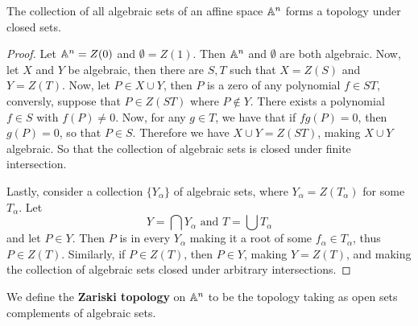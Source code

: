 \begin{lemma}\label{1.1.1}
    The collection of all algebraic sets of an affine space $\mathbb{A}^n$ forms a
    topology under closed sets.
\end{lemma}
\begin{proof}
    Let $\mathbb{A}^n=Z(0)$ and $\emptyset=Z(1)$. Then $\mathbb{A}^n$ and $\emptyset$ are both
    algebraic. Now, let  $X$ and  $Y$ be algebraic, then there are  $S,T$ such
    that  $X=Z(S)$ and $Y=Z(T)$. Now, let $P \in X \cup Y$, then  $P$ is a zero
    of any polynomial $f \in ST$, conversly, suppose that $P \in Z(ST)$ where $P
    \notin Y$. There exists a polynomial  $f \in S$ with  $f(P) \neq 0$. Now,
    for any $g \in T$, we have that if $fg(P)=0$, then $g(P)=0$, so that $P \in
    S$. Therefore we have  $X \cup Y=Z(ST)$, making $X \cup Y$ algebraic. So
    that the collection of algebraic sets is closed under finite intersection.

    Lastly, consider a collection $\{Y_\alpha\}$ of algebraic sets, where
    $Y_\alpha=Z(T_\alpha)$ for some $T_\alpha$. Let
    \begin{equation*}
        Y=\bigcap{Y_\alpha} \text{ and } T=\bigcup{T_\alpha}
    \end{equation*}
    and let $P \in Y$. Then $P$ is in every $Y_\alpha$ making it a root of some
    $f_\alpha \in T_\alpha$, thus  $P \in Z(T)$. Similarly, if $P \in Z(T)$,
    then $P \in Y$, making $Y=Z(T)$, and making the collection of algebraic sets
    closed under arbitrary intersections.
\end{proof}

\begin{definition}
    We define the \textbf{Zariski topology} on $\mathbb{A}^n$ to be the topology taking
    as open sets complements of algebraic sets.
\end{definition}
